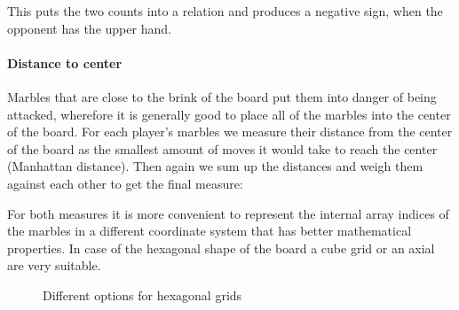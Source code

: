 \documentclass{llncs}
\begin{document}
This puts the two counts into a relation and produces a negative sign, when the opponent has the upper hand.


\paragraph{Distance to center}
Marbles that are close to the brink of the board put them into danger of being attacked, wherefore it is generally good to place all of the marbles into the center of the board. For each player's marbles we measure their distance from the center of the board as the smallest amount of moves it would take to reach the center (Manhattan distance). Then again we sum up the distances and weigh them against each other to get the final measure:


For both measures it is more convenient to represent the internal array indices of the marbles in a different coordinate system that has better mathematical properties. In case of the hexagonal shape of the board a cube grid or an axial are very suitable.

\begin{figure}[!h]
	\centering
	\hfill
	\caption{Different options for hexagonal grids \cite{noauthor_red_nodate}}
	\label{hex_grids}
\end{figure}
\end{document}

